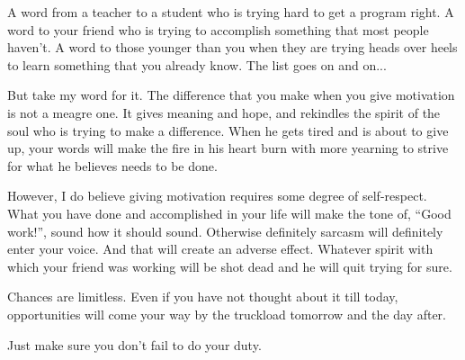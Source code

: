 \documentclass[twoside,11pt,titlepage]{article}
\begin{document}
A word from a teacher to a student who is trying hard to get a program right. A word to your friend who is trying to accomplish something that most people haven't. A word to those younger than you when they are trying heads over heels to learn something that you already know. The list goes on and on...

But take my word for it. The difference that you make when you give motivation is not a meagre one. It gives meaning and hope, and rekindles the spirit of the soul who is trying to make a difference. When he gets tired and is about to give up, your words will make the fire in his heart burn with more yearning to strive for what he believes needs to be done.

However, I do believe giving motivation requires some degree of self-respect. What you have done and accomplished in your life will make the tone of, ``Good work!'', sound how it should sound. Otherwise definitely sarcasm will definitely enter your voice. And that will create an adverse effect. Whatever spirit with which your friend was working will be shot dead and he will quit trying for sure.

Chances are limitless. Even if you have not thought about it till today, opportunities will come your way by the truckload tomorrow and the day after.

Just make sure you don't fail to do your duty.
\end{document}
